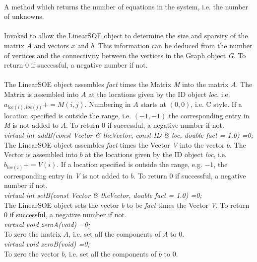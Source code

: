  \\
A method which returns the number of equations in the system, i.e. the number
of unknowns. \\  

 \\
Invoked to allow the LinearSOE object to determine the size and sparsity of 
the matrix $A$ and vectors $x$ and $b$. This information can be
deduced from the number of vertices and the connectivity between the
vertices in the Graph object {\em G}. To return $0$ if
successful, a negative number if not. \\  

 \\
The LinearSOE object assembles {\em fact} times the Matrix {\em
M} into the matrix $A$. The Matrix is assembled into $A$ at the
locations given by the ID object {\em loc}, i.e. $a_{loc(i),loc(j)} +=
M(i,j)$. Numbering in $A$ starts at $(0,0)$, i.e. C style. If a
location specified is outside the range, i.e. $(-1,-1)$ the
corresponding entry in {\em M} is not added to $A$. To return $0$ if
successful, a negative number if not. \\ 

{\em virtual int addB(const Vector \& theVector, const ID \& loc,
double fact = 1.0) =0;} \\
The LinearSOE object assembles {\em fact} times the Vector {\em V} into
the vector $b$. The Vector is assembled into $b$ at the locations
given by the ID object {\em loc}, i.e. $b_{loc(i)} += V(i)$. If a
location specified is outside the range, e.g. $-1$, the corresponding
entry in {\em V} is not added to $b$. To return $0$ if successful, a
negative number if not.  \\ 

{\em virtual int setB(const Vector \& theVector,
double fact = 1.0) =0;} \\
The LinearSOE object sets the vector {\em b} to be {\em fact} times
the Vector {\em V}. To return $0$ if successful, a negative number if
not.  \\  

{\em virtual void zeroA(void) =0;} \\
To zero the matrix $A$, i.e. set all the components of $A$ to $0$. \\

{\em virtual void zeroB(void) =0;} \\
To zero the vector $b$, i.e. set all the components of $b$ to $0$. \\

